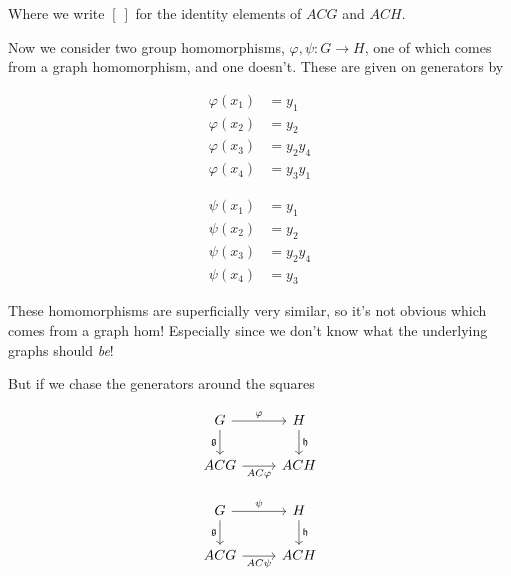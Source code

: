 \documentclass[microtype]{gtpart}
\theoremstyle{definition}
\theoremstyle{theorem}
\begin{document}
Where we write $[ \ ]$ for the identity elements of $ACG$ and $ACH$.

Now we consider two group homomorphisms, $\varphi, \psi : G \to H$, 
one of which comes from a graph homomorphism, and one doesn't. 
These are given on generators by

\noindent\begin{minipage}{.5\linewidth}
\begin{align*}
  \varphi(x_1) &= y_1 \\
  \varphi(x_2) &= y_2 \\
  \varphi(x_3) &= y_2 y_4 \\
  \varphi(x_4) &= y_3 y_1
\end{align*}
\end{minipage}%
\begin{minipage}{.5\linewidth}
\begin{align*}
  \psi(x_1) &= y_1 \\
  \psi(x_2) &= y_2 \\
  \psi(x_3) &= y_2 y_4 \\
  \psi(x_4) &= y_3
\end{align*}
\end{minipage}

These homomorphisms are superficially very similar, so it's not obvious 
which comes from a graph hom! Especially since we don't know what the 
underlying graphs should \emph{be}!

But if we chase the generators around the squares 

\setlength\mathsurround{0pt}
\noindent\begin{minipage}{.5\linewidth}
  \[\begin{tikzcd}
	G & H \\
	ACG & ACH
	\arrow["\varphi", from=1-1, to=1-2]
	\arrow["{\mathfrak{g}}"', from=1-1, to=2-1]
	\arrow["{\mathfrak{h}}", from=1-2, to=2-2]
	\arrow["AC\varphi"', from=2-1, to=2-2]
\end{tikzcd}\]
\end{minipage}%
\begin{minipage}{.5\linewidth}
  \[\begin{tikzcd}
	G & H \\
	ACG & ACH
	\arrow["\psi", from=1-1, to=1-2]
	\arrow["{\mathfrak{g}}"', from=1-1, to=2-1]
	\arrow["{\mathfrak{h}}", from=1-2, to=2-2]
	\arrow["AC\psi"', from=2-1, to=2-2]
\end{tikzcd}\]
\end{minipage}
\setlength\mathsurround{0.8pt}
\end{document}
